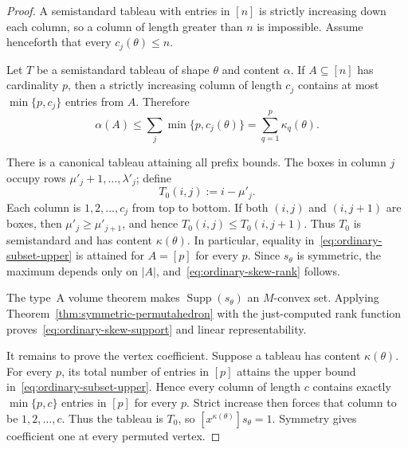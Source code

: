 \documentclass[10pt,a4paper]{amsart}
\DeclareMathOperator{\Supp}{Supp}
\begin{document}
\begin{proof}
A semistandard tableau with entries in $[n]$ is strictly increasing down each
column, so a column of length greater than $n$ is impossible.  Assume henceforth
that every $c_j(\theta)\leq n$.

Let $T$ be a semistandard tableau of shape $\theta$ and content $\alpha$.  If
$A\subseteq[n]$ has cardinality $p$, then a strictly increasing column of
length $c_j$ contains at most $\min\{p,c_j\}$ entries from $A$.  Therefore
\begin{equation}\label{eq:ordinary-subset-upper}
 \alpha(A)\leq\sum_j\min\{p,c_j(\theta)\}
 =\sum_{q=1}^{p}\kappa_q(\theta).
\end{equation}

There is a canonical tableau attaining all prefix bounds.  The boxes in column
$j$ occupy rows $\mu'_j+1,\ldots,\lambda'_j$; define
\begin{equation}\label{eq:ordinary-canonical-tableau}
 T_0(i,j):=i-\mu'_j.
\end{equation}
Each column is $1,2,\ldots,c_j$ from top to bottom.  If both $(i,j)$ and
$(i,j+1)$ are boxes, then $\mu'_j\geq\mu'_{j+1}$, and hence
$T_0(i,j)\leq T_0(i,j+1)$.  Thus $T_0$ is semistandard and has content
$\kappa(\theta)$.  In particular, equality in~\eqref{eq:ordinary-subset-upper}
is attained for $A=[p]$ for every $p$.  Since $s_\theta$ is symmetric, the
maximum depends only on $|A|$, and~\eqref{eq:ordinary-skew-rank} follows.

The type~A volume theorem makes $\Supp(s_\theta)$ an $M$-convex set.  Applying
Theorem~\ref{thm:symmetric-permutahedron} with the just-computed rank function
proves~\eqref{eq:ordinary-skew-support} and linear representability.

It remains to prove the vertex coefficient.  Suppose a tableau has content
$\kappa(\theta)$.  For every $p$, its total number of entries in $[p]$ attains
the upper bound in~\eqref{eq:ordinary-subset-upper}.  Hence every column of
length $c$ contains exactly $\min\{p,c\}$ entries in $[p]$ for every $p$.
Strict increase then forces that column to be $1,2,\ldots,c$.  Thus the tableau
is $T_0$, so $[x^{\kappa(\theta)}]s_\theta=1$.  Symmetry gives coefficient one
at every permuted vertex.
\end{proof}
\end{document}
